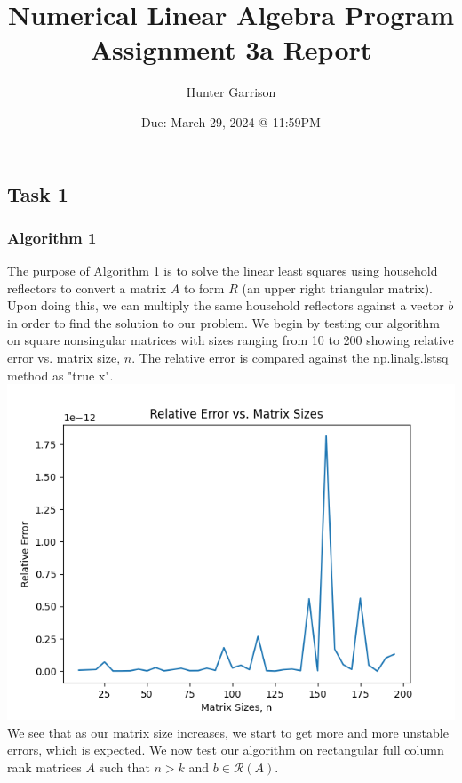 \documentclass{article}
\title{Numerical Linear Algebra Program Assignment 3a Report}
\author{Hunter Garrison}
\date{Due: March 29, 2024 @ 11:59PM}
\begin{document}
\maketitle  %

\subsection*{Task 1}
\subsubsection*{Algorithm 1}
The purpose of Algorithm 1 is to solve the linear least squares using household reflectors to convert a matrix $A$ to form $R$ 
(an upper right triangular matrix). Upon doing this, we can multiply the same household reflectors against a vector $b$ in order to find
the solution to our problem.\newline\newline
We begin by testing our algorithm on square nonsingular matrices with sizes ranging from 10 to 200 showing relative error vs. 
matrix size, $n$. The relative error is compared against the np.linalg.lstsq method as "true x".\newline
\includegraphics[width=\linewidth]{Images/Figure_1.png}\newline
We see that as our matrix size increases, we start to get more and more unstable errors, which is expected.\newline\newline
We now test our algorithm on rectangular full column rank matrices $A$ such that $n > k$ and $b\in\mathcal{R}(A)$.\newline
\end{document}
